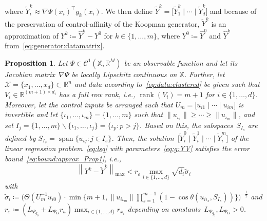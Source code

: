 \documentclass[a4paper, reqno]{amsart}
\newcommand{\R}{\ensuremath{\mathbb R}}
\newtheorem{proposition}[theorem]{Proposition}
\begin{document}
where $\tilde{Y}^k_i \approx \nabla\Psi(x_{i})^\top{g}_k(x_i)$. We then define $\tilde{Y}^k = \Big[ \tilde{Y}_1^k \mid \cdots \mid \tilde{Y}_d^k \Big]$ and because of the preservation of control-affinity of the Koopman generator, $\tilde{Y}^k$ is an approximation of ${Y}^k \coloneqq \hat{Y}^k - Y^0$ for $k \in \{1, \dots, m\}$, where $Y^0 \coloneqq \hat{Y}^0$ and $\hat{Y}^k$ from~\eqref{eq:generator:datamatrix}. 

\begin{proposition}\label{cor:approx:error:generator}
    Let $\Psi \in \mathcal C^1(\mathbb{X}, \R^M)$ be an observable function and let its Jacobian matrix~$\nabla\Psi$ be locally Lipschitz continuous on $\mathbb{X}$. Further, let $\mathcal{X} = \{x_1, \dots, x_d\} \subset \R^n$ and data according to~\eqref{eq:data:clustered} be given such that $V_i \in \R^{(m + 1) \times d_i}$
    has a full row rank, i.e., $\operatorname{rank}(V_i) = m + 1$ for $i \in \{1, \dots, d\}$. Moreover, let the control inputs be arranged such that $U_m = \Big[u_{i1} \mid \cdots \mid u_{im}\Big]$ is invertible and let $\{\iota_1,\ldots,\iota_m\} = \{1, \dots, m\}$ such that $\|u_{\iota_1}\|\ge\cdots\ge\|u_{\iota_m}\|$, and set $I_j = \{1, \dots, m\}\backslash\{\iota_1,\ldots,\iota_j\} = \{\iota_p : p>j\}$. 
    Based on this, the subspaces~$S_{I_s}$ are defined by $ S_{I_s}= \operatorname{span}\{u_{ij} : j\in I_s\}$. Then, the solution~$\Big[ \tilde{Y}^0_i \mid \tilde{Y}^1_i \mid \cdots \mid \tilde{Y}^m_i \Big]$ of the linear regression problem~\eqref{eq:lsq} with parameters~\eqref{eq:g:YV} satisfies the error bound~\eqref{eq:bound:approx_Prop1}, i.e., 
    \begin{equation}\label{eq:bound:approx_Prop4.1}
        \left\lVert  Y^k - \tilde{Y}^k\right\rVert_\mathrm{max} 
        < r_\varepsilon \max_{i \in \{1, \dots, d\}}\sqrt{d_i} \tilde{\sigma}_i
    \end{equation}
    with $\tilde{\sigma}_i \coloneqq \Big(\Theta(U_m^{-1}u_{i0}) \cdot \min\{m + 1, \|u_{i\iota_m}\| \prod_{s = 1}^{m - 1}(1 - \cos\theta(u_{i\iota_s}, S_{I_s}))\}\Big)^{-\frac12}$  and $r_\varepsilon \coloneqq (L_{\Psi_{g_0}} + L_{\Psi_G} r_u)\max_{i \in \{1, \dots, d\}}r_{x_i}$ depending on constants~$L_{\Psi_{g_0}}, L_{\Psi_G} > 0$.
\end{proposition}
\end{document}
